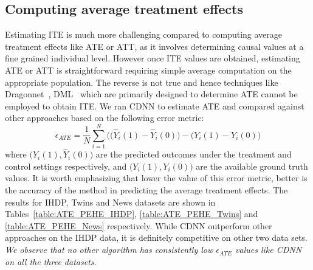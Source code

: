 \documentclass[sigconf]{acmart}
\theoremstyle{plain}
\numberwithin{equation}{section}
\begin{document}
\subsection{Computing average treatment effects}
Estimating ITE is much more challenging compared to computing average treatment effects like ATE or ATT, as it involves determining causal values at a fine grained individual level. However once ITE values are obtained, estimating ATE or ATT is straightforward requiring simple average computation on the appropriate population. The reverse is not true and hence techniques like Dragonnet~\cite{Dragonnet}, DML~\cite{doubleML} which are primarily designed to determine ATE cannot be employed to obtain ITE. We ran CDNN to estimate ATE and compared against other approaches based on the following error metric: $$\epsilon_{ATE} = \frac{1}{N}\sum_{i=1}^{N}\Big((\hat{Y}_i(1)-\hat{Y}_i(0)\Big) - \Big(Y_i(1) - Y_i(0)\Big)$$ where $\Big(\hat{Y}_i(1), \hat{Y}_i(0)\Big)$ are the predicted outcomes under the treatment and control settings respectively, and $\Big(Y_i(1), Y_i(0)\Big)$ are the available ground truth values. It is worth emphasizing that lower the value of this error metric, better is the accuracy of the method in predicting the average treatment effects. The results for IHDP, Twins and News datasets are shown in Tables~\ref{table:ATE_PEHE_IHDP}, \ref{table:ATE_PEHE_Twins} and \ref{table:ATE_PEHE_News} respectively. While CDNN outperform other approaches on the IHDP data, it is definitely competitive on other two data sets. \emph{We observe that no other algorithm has consistently low $\epsilon_{ATE}$ values like CDNN on all the three datasets.}
\end{document}
